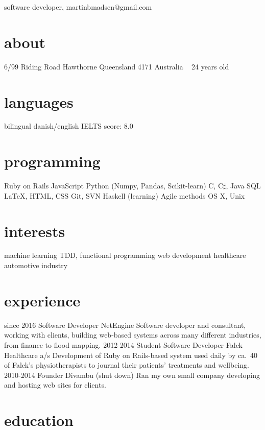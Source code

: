 \documentclass{afriggeri-cv/friggeri-cv}
\begin{document}
{software developer, martinbmadsen@gmail.com}

\begin{aside}
  \section{about}
    6/99 Riding Road
    Hawthorne
    Queensland 4171
    Australia
    ~
    24 years old
  \section{languages}
    bilingual danish/english
    IELTS score: 8.0
  \section{programming}
    Ruby on Rails
    JavaScript
    Python (Numpy, Pandas, Scikit-learn)
    C, C$\sharp$, Java
    SQL
    \LaTeX, HTML, CSS
    Git, SVN
    Haskell (learning)
    Agile methods
    OS X, Unix
  \section{interests}
    machine learning
    TDD, functional programming
    web development
    healthcare
    automotive industry
\end{aside}

\section{experience}

\begin{entrylist}
  \entry%
    {since 2016}
    {Software Developer}
    {NetEngine}
    {Software developer and consultant, working with clients, building web-based systems across many
    different industries, from finance to flood mapping.}
  \entry%
    {2012-2014}
    {Student Software Developer}
    {Falck Healthcare a/s}
    {Development of Ruby on Rails-based system used daily by ca.\ 40 of Falck's physiotherapists to journal their patients' treatments and wellbeing.}
  \entry
    {2010-2014}
    {Founder}
    {Divambu (shut down)}
    {Ran my own small company developing and hosting web sites for clients.}
\end{entrylist}

\section{education}
\end{document}

